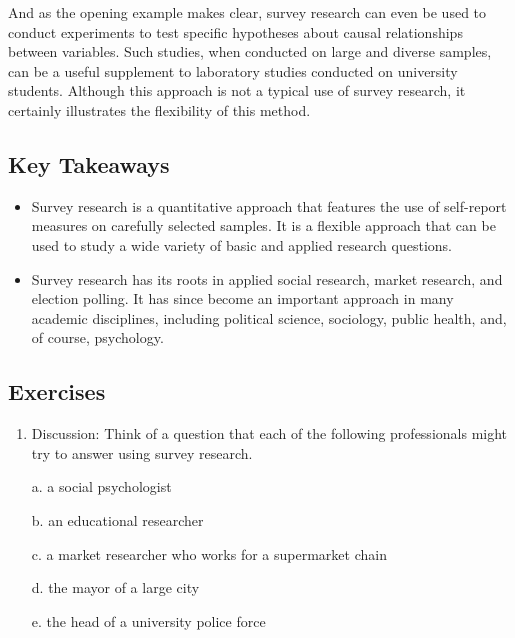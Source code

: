 And as the opening example makes clear, survey research can even be used to conduct experiments to test specific hypotheses about causal relationships between variables. Such studies, when conducted on large and diverse samples, can be a useful supplement to laboratory studies conducted on university students. Although this approach is not a typical use of survey research, it certainly illustrates the flexibility of this method.


\subsection{Key Takeaways}

\begin{fullwidth}

\begin{itemize}


\item Survey research is a quantitative approach that features the use of self-report measures on carefully selected samples. It is a flexible approach that can be used to study a wide variety of basic and applied research questions.

\item Survey research has its roots in applied social research, market research, and election polling. It has since become an important approach in many academic disciplines, including political science, sociology, public health, and, of course, psychology.


\end{itemize}

\end{fullwidth}



\subsection{Exercises}

\begin{fullwidth}

\begin{enumerate}

\item  Discussion: Think of a question that each of the following professionals might try to answer using survey research.

a. a social psychologist

b. an educational researcher

c. a market researcher who works for a supermarket chain

d. the mayor of a large city

e. the head of a university police force

\end{enumerate}

\end{fullwidth}

